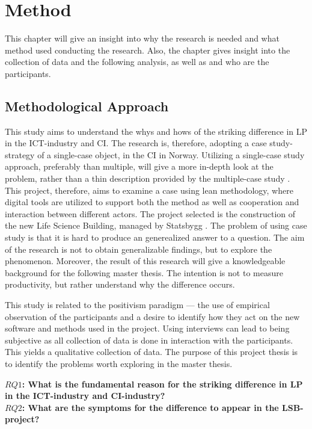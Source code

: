 
\chapter{Method}
This chapter will give an insight into why the research is needed and what method used conducting the research. Also, the chapter gives insight into the collection of data and the following analysis, as well as and who are the participants.

\section{Methodological Approach} \label{sec:purpose}
This study aims to understand the whys and hows of the striking difference in LP in the ICT-industry and CI. The research is, therefore, adopting a case study-strategy of a single-case object, in the CI in Norway. Utilizing a single-case study approach, preferably than multiple, will give a more in-depth look at the problem, rather than a thin description provided by the multiple-case study \cite{yin1993case}. This project, therefore, aims to examine a case using lean methodology, where digital tools are utilized to support both the method as well as cooperation and interaction between different actors. The project selected is the construction of the new Life Science Building, managed by Statsbygg \cite{statsbygg2019uio}. The problem of using case study is that it is hard to produce an generealized answer to a question. The aim of the research is not to obtain generalizable findings, but to explore the phenomenon. Moreover, the result of this research will give a knowledgeable background for the following master thesis. The intention is not to measure productivity, but rather understand why the difference occurs.

This study is related to the positivism paradigm — the use of empirical observation of the participants and a desire to identify how they act on the new software and methods used in the project. Using interviews can lead to being subjective as all collection of data is done in interaction with the participants. This yields a qualitative collection of data. The purpose of this project thesis is to identify the problems worth exploring in the master thesis.

{\noindent \bf $RQ1$: What is the fundamental reason for the striking difference in LP in the ICT-industry and CI-industry?} \\
{\bf $RQ2$: What are the symptoms for the difference to appear in the LSB-project?}

